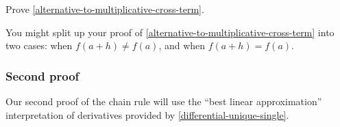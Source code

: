 \begin{exercise} \label{chain-rule-single-first-proof-details}
	Prove \cref{alternative-to-multiplicative-cross-term}. 
	\begin{hint} You might split up your proof of \cref{alternative-to-multiplicative-cross-term} into two cases: when $f(a+h) \neq f(a)$, and when $f(a+h) = f(a)$. 
	\end{hint}
\end{exercise}

\subsubsection*{Second proof}

Our second proof of the chain rule will use the ``best linear approximation'' interpretation of derivatives provided by \cref{differential-unique-single}. 

